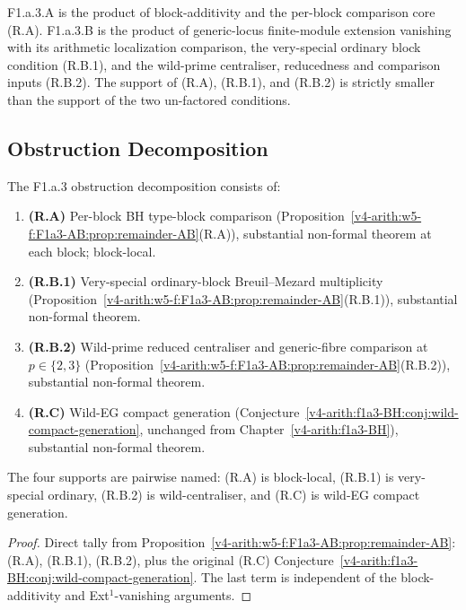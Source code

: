 \begin{remark}
\label{v4-arith:w5-f:F1a3-AB:rem:reduction-summary}
F1.a.3.A is the product of block-additivity and the per-block
comparison core (R.A). F1.a.3.B is the product of generic-locus
finite-module extension vanishing with its arithmetic localization
comparison, the very-special ordinary block condition (R.B.1), and
the wild-prime centraliser, reducedness and comparison inputs (R.B.2). The support of (R.A), (R.B.1), and (R.B.2) is strictly smaller
than the support of the two un-factored conditions.
\end{remark}

\subsection{Obstruction Decomposition}

\begin{proposition}
\label{v4-arith:w5-f:F1a3-AB:prop:F1a3-table-updated}
\ClaimStatusProvedHere The F1.a.3 obstruction decomposition consists
of:
\begin{enumerate}
\item \textbf{(R.A)} Per-block BH type-block comparison
(Proposition~\ref{v4-arith:w5-f:F1a3-AB:prop:remainder-AB}(R.A)), substantial
non-formal theorem at each block; block-local.
\item \textbf{(R.B.1)} Very-special ordinary-block Breuil--Mezard
multiplicity (Proposition~\ref{v4-arith:w5-f:F1a3-AB:prop:remainder-AB}(R.B.1)),
substantial non-formal theorem.
\item \textbf{(R.B.2)} Wild-prime reduced centraliser and generic-fibre comparison at
\(p\in\{2,3\}\) (Proposition~\ref{v4-arith:w5-f:F1a3-AB:prop:remainder-AB}(R.B.2)),
substantial non-formal theorem.
\item \textbf{(R.C)} Wild-EG compact generation
(Conjecture~\ref{v4-arith:f1a3-BH:conj:wild-compact-generation}, unchanged
from Chapter~\ref{v4-arith:f1a3-BH}), substantial non-formal theorem.
\end{enumerate}
The four supports are pairwise named: (R.A) is block-local, (R.B.1) is
very-special ordinary, (R.B.2) is wild-centraliser, and (R.C) is
wild-EG compact generation.
\end{proposition}

\begin{proof}
Direct tally from
Proposition~\ref{v4-arith:w5-f:F1a3-AB:prop:remainder-AB}: (R.A), (R.B.1),
(R.B.2), plus the original (R.C)
Conjecture~\ref{v4-arith:f1a3-BH:conj:wild-compact-generation}. The last term is
independent of the block-additivity and Ext\({}^{1}\)-vanishing
arguments.
\end{proof}

